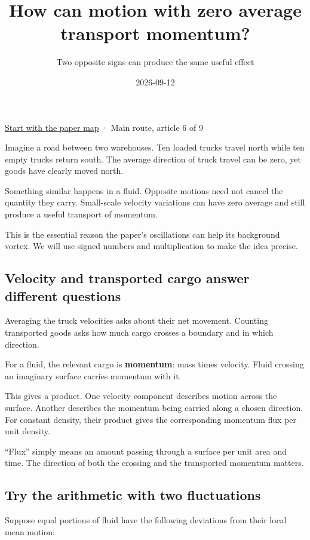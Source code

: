 \documentclass[
  english,
  11pt,
]{article}
\title{How can motion with zero average transport momentum?}
\subtitle{Two opposite signs can produce the same useful effect}
\author{}
\date{2026-09-12}
\begin{document}
\maketitle


\href{../paper-map/article.html}{Start with the paper map} · Main route,
article 6 of 9

Imagine a road between two warehouses. Ten loaded trucks travel north
while ten empty trucks return south. The average direction of truck
travel can be zero, yet goods have clearly moved north.

Something similar happens in a fluid. Opposite motions need not cancel
the quantity they carry. Small-scale velocity variations can have zero
average and still produce a useful transport of momentum.

This is the essential reason the paper's oscillations can help its
background vortex. We will use signed numbers and multiplication to make
the idea precise.

\subsection{Velocity and transported cargo answer different
questions}\label{velocity-and-transported-cargo-answer-different-questions}

Averaging the truck velocities asks about their net movement. Counting
transported goods asks how much cargo crosses a boundary and in which
direction.

For a fluid, the relevant cargo is \textbf{momentum}: mass times
velocity. Fluid crossing an imaginary surface carries momentum with it.

This gives a product. One velocity component describes motion across the
surface. Another describes the momentum being carried along a chosen
direction. For constant density, their product gives the corresponding
momentum flux per unit density.

``Flux'' simply means an amount passing through a surface per unit area
and time. The direction of both the crossing and the transported
momentum matters.

\subsection{Try the arithmetic with two
fluctuations}\label{try-the-arithmetic-with-two-fluctuations}

Suppose equal portions of fluid have the following deviations from their
local mean motion:
\end{document}

